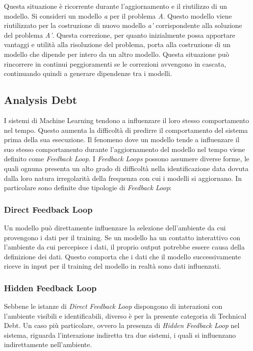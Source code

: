 Questa situazione è ricorrente durante l'aggiornamento e il riutilizzo di un modello. Si consideri un modello \textit{a} per il problema \textit{A}. Questo modello viene riutilizzato per la costruzione di nuovo modello \textit{a'} corrispondente alla soluzione del problema \textit{A'}. Questa correzione, per quanto inizialmente possa apportare vantaggi e utilità alla risoluzione del problema, porta alla costruzione di un modello che dipende per intero da un altro modello. Questa situazione può rincorrere in continui peggioramenti se le correzioni avvengono in cascata, continuando quindi a generare dipendenze tra i modelli.

\subsection{Analysis Debt}
I sistemi di Machine Learning tendono a influenzare il loro stesso comportamento nel tempo. Questo aumenta la difficoltà di predirre il comportamento del sistema prima della sua esecuzione. 
Il fenomeno dove un modello tende a influenzare il suo stesso comportamento durante l'aggiornamento del modello nel tempo viene definito come \textit{Feedback Loop}.
I \textit{Feedback Loops} possono assumere diverse forme, le quali ognuna presenta un alto grado di difficoltà nella identificazione data dovuta dalla loro natura irregolarità della frequenza con cui i modelli si aggiornano.
In particolare sono definite due tipologie di \textit{Feedback Loop}:

\subsubsection{Direct Feedback Loop}
Un modello può direttamente influenzare la selezione dell'ambiente da cui provengono i dati per il training. Se un modello ha un contatto interattivo con l'ambiente da cui percepisce i dati, il proprio output potrebbe essere causa della definizione dei dati. Questo comporta che i dati che il modello successivamente riceve in input per il training del modello in realtà sono dati influenzati.

\subsubsection{Hidden Feedback Loop}
Sebbene le istanze di \textit{Direct Feedback Loop} dispongono di interazioni con l'ambiente visibili e identificabili, diverso è per la presente categoria di Technical Debt.
Un caso più particolare, ovvero la presenza di \textit{Hidden Feedback Loop} nel sistema, riguarda l'interazione indiretta tra due sistemi, i quali si influenzano indirettamente nell'ambiente.

